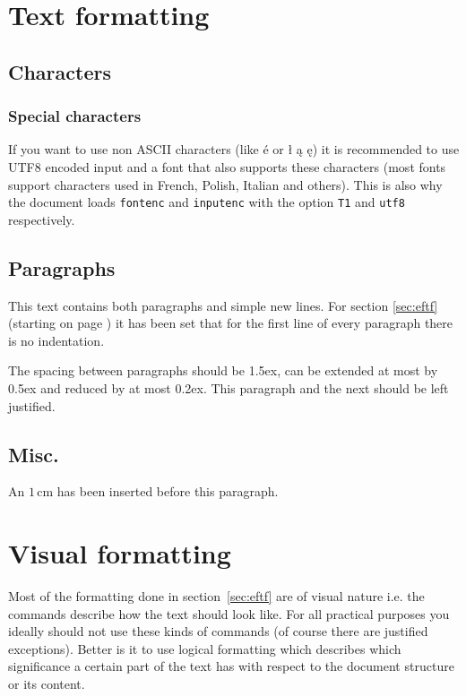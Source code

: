 \documentclass[11pt, a4paper]{article}
\begin{document}
\section{Text formatting\label{sec:eftf}}

\subsection{Characters}

\subsubsection{Special characters}
If you want to use non ASCII characters (like é or ł ą ę) it is recommended to use UTF8 encoded input and a font that also supports these characters (most fonts support characters used in French, Polish, Italian and others). This is also why the document loads \texttt{fontenc} and \texttt{inputenc} with the option \texttt{T1} and \texttt{utf8} respectively.

\subsection{Paragraphs}
This text contains both paragraphs and simple new lines. For section \ref{sec:eftf} (starting on page \pageref{sec:eftf}) it has been set that for the first line of every paragraph there is no indentation.

\begingroup
\raggedright %
The spacing between paragraphs should be 1.5ex, can be extended at most by 0.5ex and reduced by at most 0.2ex. This paragraph and the next should be left justified. 

\vspace{1cm}
\subsection{Misc.} 
An  $1$\,cm has been inserted before this paragraph.
\endgroup
\endgroup

\section{Visual formatting}
Most of the formatting done in section~\ref{sec:eftf}  are of visual nature i.e. the commands describe how the text should look like. For all practical purposes you ideally should not use these kinds of commands (of course there are justified exceptions). Better is it to use logical formatting which describes which significance a certain part of the text has with respect to the document structure or its content.
\end{document}

